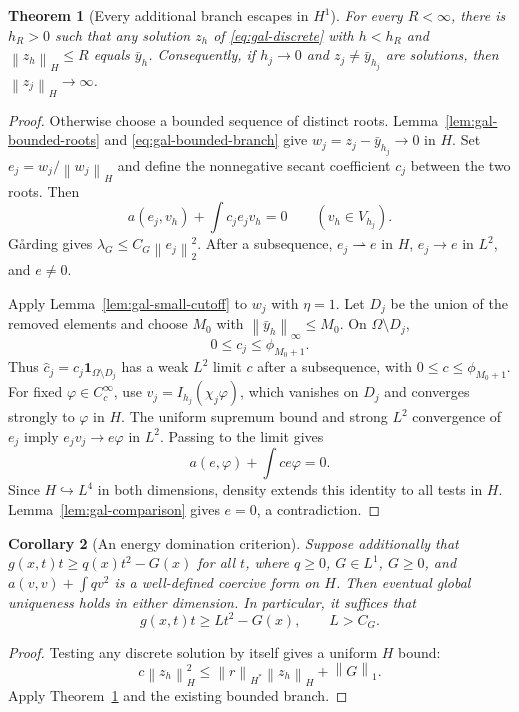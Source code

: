 \documentclass[11pt,a4paper]{article}
\newcommand{\norm}[1]{\left\lVert#1\right\rVert}
\newtheorem{theorem}{Theorem}[section]
\newtheorem{corollary}[theorem]{Corollary}
\theoremstyle{definition}
\theoremstyle{remark}
\numberwithin{equation}{section}
\begin{document}
\begin{theorem}[Every additional branch escapes in $H^1$]\label{thm:gal-H1-escape}
For every $R<\infty$, there is $h_R>0$ such that any solution $z_h$ of \eqref{eq:gal-discrete} with $h<h_R$ and $\norm{z_h}_H\le R$ equals $\bar y_h$. Consequently, if $h_j\to0$ and $z_j\ne\bar y_{h_j}$ are solutions, then $\norm{z_j}_H\to\infty$.
\end{theorem}
\begin{proof}
Otherwise choose a bounded sequence of distinct roots. Lemma~\ref{lem:gal-bounded-roots} and \eqref{eq:gal-bounded-branch} give $w_j=z_j-\bar y_{h_j}\to0$ in $H$. Set $e_j=w_j/\norm{w_j}_H$ and define the nonnegative secant coefficient $c_j$ between the two roots. Then
\[
 a(e_j,v_h)+\int c_je_jv_h=0\qquad(v_h\in V_{h_j}).
\]
G\aa rding gives $\lambda_G\le C_G\norm{e_j}_2^2$. After a subsequence, $e_j\rightharpoonup e$ in $H$, $e_j\to e$ in $L^2$, and $e\ne0$.

Apply Lemma~\ref{lem:gal-small-cutoff} to $w_j$ with $\eta=1$. Let $D_j$ be the union of the removed elements and choose $M_0$ with $\norm{\bar y_h}_\infty\le M_0$. On $\Omega\setminus D_j$,
\[
 0\le c_j\le\phi_{M_0+1}.
\]
Thus $\widehat c_j=c_j\mathbf1_{\Omega\setminus D_j}$ has a weak $L^2$ limit $c$ after a subsequence, with $0\le c\le\phi_{M_0+1}$. For fixed $\varphi\in C_c^\infty$, use $v_j=I_{h_j}(\chi_j\varphi)$, which vanishes on $D_j$ and converges strongly to $\varphi$ in $H$. The uniform supremum bound and strong $L^2$ convergence of $e_j$ imply $e_jv_j\to e\varphi$ in $L^2$. Passing to the limit gives
\[
 a(e,\varphi)+\int ce\varphi=0.
\]
Since $H\hookrightarrow L^4$ in both dimensions, density extends this identity to all tests in $H$. Lemma~\ref{lem:gal-comparison} gives $e=0$, a contradiction.
\end{proof}

\begin{corollary}[An energy domination criterion]\label{cor:gal-energy-criterion}
Suppose additionally that $g(x,t)t\ge q(x)t^2-G(x)$ for all $t$, where $q\ge0$, $G\in L^1$, $G\ge0$, and $a(v,v)+\int qv^2$ is a well-defined coercive form on $H$. Then eventual global uniqueness holds in either dimension. In particular, it suffices that
\[
 g(x,t)t\ge L t^2-G(x),\qquad L>C_G.
\]
\end{corollary}
\begin{proof}
Testing any discrete solution by itself gives a uniform $H$ bound:
\[
 c\norm{z_h}_H^2\le\norm r_{H^*}\norm{z_h}_H+\norm G_1.
\]
Apply Theorem~\ref{thm:gal-H1-escape} and the existing bounded branch.
\end{proof}
\end{document}
